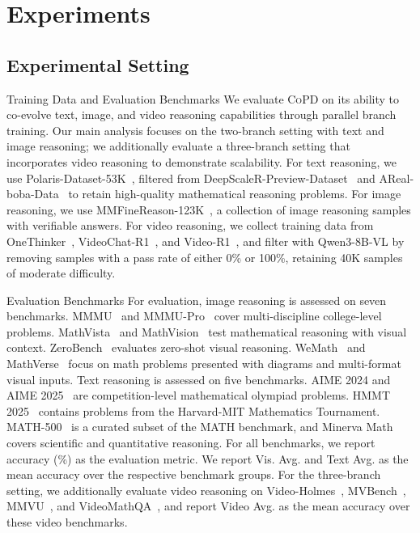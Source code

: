 \documentclass{llmxive}
\providecommand{\method}{\textsc{CoPD}\xspace}
\begin{document}
\section{Experiments} 
\label{sec:exps}
\subsection{Experimental Setting}
{Training Data and Evaluation Benchmarks} 
We evaluate \method on its ability to co-evolve text, image, 
and video reasoning capabilities through parallel branch 
training. Our main analysis focuses on the two-branch setting 
with text and image reasoning; we additionally evaluate a 
three-branch setting that incorporates video reasoning to 
demonstrate scalability. For text reasoning, we use 
Polaris-Dataset-53K~\cite{Polaris2025}, filtered from 
DeepScaleR-Preview-Dataset~\cite{deepscaler2025} and 
AReal-boba-Data~\cite{fu2025areal} to retain high-quality mathematical 
reasoning problems. For image reasoning, we use 
MMFineReason-123K~\cite{lin2026mmfinereason}, a collection of image reasoning 
samples with verifiable answers. For video reasoning, we collect training data from OneThinker~\cite{feng2025onethinker}, VideoChat-R1~\cite{li2025videochatr1enhancingspatiotemporalperception}, and Video-R1~\cite{feng2025videor1}, and filter with Qwen3-8B-VL by removing samples with a pass rate of either 0\% or 100\%, retaining 40K samples of moderate difficulty.

{Evaluation Benchmarks} For evaluation, image reasoning is assessed on seven benchmarks. MMMU~\cite{yue2024mmmumassivemultidisciplinemultimodal} and MMMU-Pro~\cite{yue2025mmmuprorobustmultidisciplinemultimodal} cover multi-discipline college-level problems. MathVista~\cite{lu2024mathvistaevaluatingmathematicalreasoning} and MathVision~\cite{wang2024measuring} test mathematical reasoning with visual context. ZeroBench~\cite{roberts2025zerobenchimpossiblevisualbenchmark} evaluates zero-shot visual reasoning. WeMath~\cite{qiao-etal-2025-math} and MathVerse~\cite{zhang2024mathversedoesmultimodalllm} focus on math problems presented with diagrams and multi-format visual inputs. Text reasoning is assessed on five benchmarks. AIME 2024 and AIME 2025~\cite{aime} are competition-level mathematical olympiad problems. HMMT 2025~\cite{balunovic_srimatharena_2025} contains problems from the Harvard-MIT Mathematics Tournament. MATH-500~\cite{math500hendrycks2021measuringmathematicalproblemsolving} is a curated subset of the MATH benchmark, and Minerva Math~\cite{lewkowycz2022solvingquantitativereasoningproblemsminerva} covers scientific and quantitative reasoning. For all benchmarks, we report accuracy (\%) as the evaluation metric. We report Vis. Avg. and Text Avg. as the mean accuracy over the respective benchmark groups. For the three-branch setting, we additionally evaluate video reasoning on Video-Holmes~\cite{cheng2025videoholmesmllmthinklike}, MVBench~\cite{li2024mvbenchcomprehensivemultimodalvideo}, MMVU~\cite{zhao2025mmvumeasuringexpertlevelmultidiscipline}, and VideoMathQA~\cite{rasheed2025videomathqabenchmarkingmathematicalreasoning}, and report Video Avg. as the mean accuracy over these video benchmarks.
\end{document}
